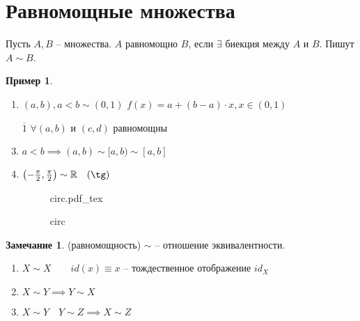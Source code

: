 \documentclass{book}
\newcommand\R{\ensuremath{\mathbb{R}}}
\newcommand{\ov}[1]{\overline{#1}}
\theoremstyle{definition}
\newtheorem*{note}{Замечание}
\newtheorem*{example}{Пример}
\newcommand{\incfig}[1]{%
    \def\svgwidth{\columnwidth}
    {#1.pdf_tex}
}
\begin{document}
    \section{Равномощные множества}

    \begin{definition}
        Пусть $A,B$ -- множества.
        $A$ равномощно $B$, если $\exists $ биекция между $A$ и $B$. 
        Пишут  $A\sim B$.
    \end{definition}
    \begin{example}
        \begin{enumerate}
            \item $(a,b), a<b \sim (0,1)$
            $f(x) = a+(b-a)\cdot x, x\in (0,1)$
            \item[$\ov{1}$] $\forall (a,b)$ и $(c,d)$ равномощны
            \item $a<b \implies (a,b)\sim [a,b) \sim [a,b]$
            \item $\left( -\frac{\pi}{2}, \frac{\pi }{2} \right) \sim \R\quad (\tg)$
    \begin{figure}[ht]
        \centering
        \incfig{circ}
        \caption{circ}
        \label{fig:circ}
    \end{figure}
        \end{enumerate}
    \end{example}

    \begin{note}
        (равномощность) $\sim $ -- отношение эквивалентности.

        \begin{enumerate}
            \item $X\sim X\qquad id(x) \equiv x$ -- тождественное отображение $id_X$
            \item $X\sim Y \implies  Y\sim X$
            \item $X\sim Y\quad Y\sim Z \implies X\sim Z$
        \end{enumerate}
    \end{note}
\end{document}
